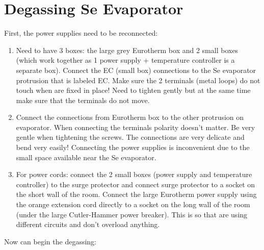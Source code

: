 \section{Degassing Se Evaporator}
First, the power supplies need to be reconnected:
\begin{enumerate}
\item Need to have 3 boxes: the large grey Eurotherm box and 2 small boxes (which work together as 1 power supply + temperature controller is a separate box). Connect the EC (small box) connections to the Se evaporator protrusion that is labeled EC. Make sure the 2 terminals (metal loops) do not touch when are fixed in place! Need to tighten gently but at the same time make sure that the terminals do not move.
\item Connect the connections from Eurotherm box to the other protrusion on evaporator. When connecting the terminals polarity doesn’t matter. Be very gentle when tightening the screws. The connections are very delicate and bend very easily! Connecting the power supplies is inconvenient due to the small space available near the Se evaporator.
\item For power cords: connect the 2 small boxes (power supply and temperature controller) to the surge protector and connect surge protector to a socket on the short wall of the room. Connect the large Eurotherm power supply using the orange extension cord directly to a socket on the long wall of the room (under the large Cutler-Hammer power breaker). This is so that are using different circuits and don’t overload anything.
\end{enumerate}
Now can begin the degassing:
